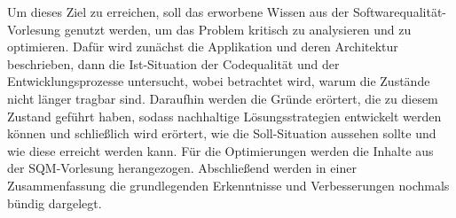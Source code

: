 Um dieses Ziel zu erreichen, soll das erworbene Wissen aus der Softwarequalität-Vorlesung genutzt werden, 
um das Problem kritisch zu analysieren und zu optimieren. 
Dafür wird zunächst die Applikation und deren Architektur beschrieben, 
dann die Ist-Situation der Codequalität und der Entwicklungsprozesse untersucht, 
wobei betrachtet wird, warum die Zustände nicht länger tragbar sind. 
Daraufhin werden die Gründe erörtert, die zu diesem Zustand geführt haben, 
sodass nachhaltige Lösungsstrategien entwickelt werden können 
und schließlich wird erörtert, wie 
die Soll-Situation aussehen sollte und wie diese erreicht werden kann. 
Für die Optimierungen werden die Inhalte aus der SQM-Vorlesung herangezogen. 
Abschließend werden in einer Zusammenfassung die grundlegenden Erkenntnisse und Verbesserungen nochmals bündig dargelegt.



